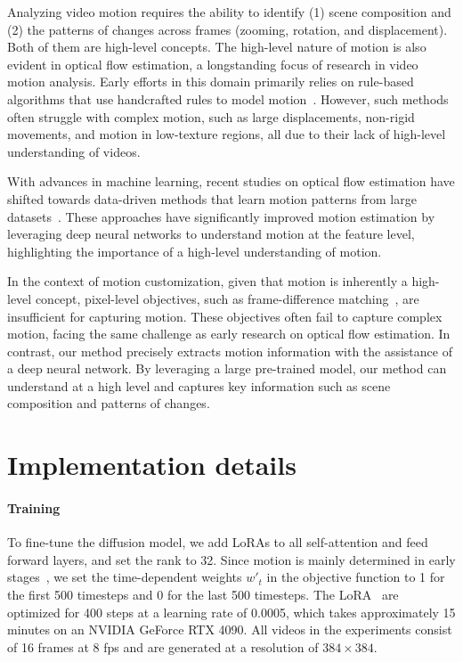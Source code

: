 Analyzing video motion requires the ability to identify (1) scene composition and (2) the patterns of changes across frames (\ie zooming, rotation, and displacement). Both of them are high-level concepts. The high-level nature of motion is also evident in optical flow estimation, a longstanding focus of research in video motion analysis. Early efforts in this domain primarily relies on rule-based algorithms that use handcrafted rules to model motion~\cite{algo1, algo2, algo3, algo4}. However, such methods often struggle with complex motion, such as large displacements, non-rigid movements, and motion in low-texture regions, all due to their lack of high-level understanding of videos.

With advances in machine learning, recent studies on optical flow estimation have shifted towards data-driven methods that learn motion patterns from large datasets~\cite{deep1, deep2, deep3, deep4, deep5}. These approaches have significantly improved motion estimation by leveraging deep neural networks to understand motion at the feature level, highlighting the importance of a high-level understanding of motion. 

In the context of motion customization, given that motion is inherently a high-level concept, pixel-level objectives, such as frame-difference matching~\cite{md,vmc,sma}, are insufficient for capturing motion. These objectives often fail to capture complex motion, facing the same challenge as early research on optical flow estimation. In contrast, our method precisely extracts motion information with the assistance of a deep neural network. By leveraging a large pre-trained model, our method can understand at a high level and captures key information such as scene composition and patterns of changes.

\section{Implementation details}
\label{sec:rationale}

\paragraph{Training}
\label{sec:supp_training}
To fine-tune the diffusion model, we add LoRAs to all self-attention and feed forward layers, and set the rank to 32. Since motion is mainly determined in early stages~\cite{mc,dmt}, we set the time-dependent weights $w'_t$ in the objective function to 1 for the first 500 timesteps and 0 for the last 500 timesteps. The LoRA~\cite{lora} are optimized for 400 steps at a learning rate of 0.0005, which takes approximately 15 minutes on an NVIDIA GeForce RTX 4090. All videos in the experiments consist of 16 frames at 8 fps and are generated at a resolution of $384\times 384$.
  
